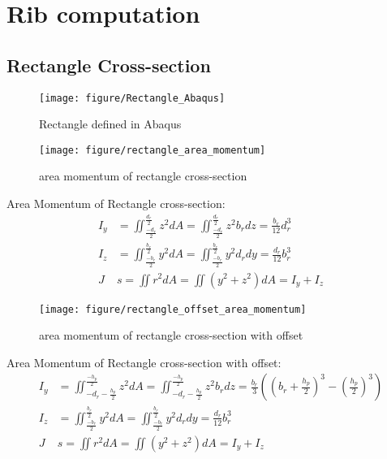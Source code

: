 
\section{Rib computation}
\subsection{Rectangle Cross-section}
\begin{figure}[h!]
	\centering
	\texttt{[image: figure/Rectangle\_Abaqus]}
	\caption{Rectangle defined in Abaqus}
	\label{fig:rectangleabaqus}
\end{figure}

\begin{figure}[h!]
	\centering
	\texttt{[image: figure/rectangle\_area\_momentum]}
	\caption{area momentum of rectangle cross-section}
	\label{fig:rectangleareamomentum}
\end{figure}

Area Momentum of Rectangle cross-section:
\begin{align*}
I_y &= \iint_{\frac{-d_r}{2}}^{\frac{d_r}{2}} z^2 dA = \iint_{\frac{-d_r}{2}}^{\frac{d_r}{2}} z^2 b_r dz = \frac{b_r}{12} d_r^3 \\
I_z &= \iint_{\frac{-b_r}{2}}^{\frac{b_r}{2}} y^2 dA = \iint_{\frac{-b_r}{2}}^{\frac{b_r}{2}} y^2 d_r dy = \frac{d_r}{12} b_r^3 \\ 
J &s= \iint r^2 dA = \iint \left( y^2+z^2\right)  dA = I_y + I_z
\end{align*}

\begin{figure}[h!]
	\centering
	\texttt{[image: figure/rectangle\_offset\_area\_momentum]}
	\caption{area momentum of rectangle cross-section with offset}
	\label{fig:rectangleoffsetareamomentum}
\end{figure}

Area Momentum of Rectangle cross-section with offset:
\begin{align*}
I_y &= \iint_{-d_r-\frac{h_p}{2}}^{\frac{-h_p}{2}} z^2 dA = \iint_{-d_r-\frac{h_p}{2}}^{\frac{-h_p}{2}} z^2 b_r dz = \frac{b_r}{3} \left( \left( b_r+\frac{h_p}{2}\right)^3 - \left( \frac{h_p}{2}\right)^3   \right) \\
I_z &= \iint_{\frac{-b_r}{2}}^{\frac{b_r}{2}} y^2 dA = \iint_{\frac{-b_r}{2}}^{\frac{b_r}{2}} y^2 d_r dy = \frac{d_r}{12} b_r^3 \\ 
J &s= \iint r^2 dA = \iint \left( y^2+z^2\right)  dA = I_y + I_z
\end{align*}

